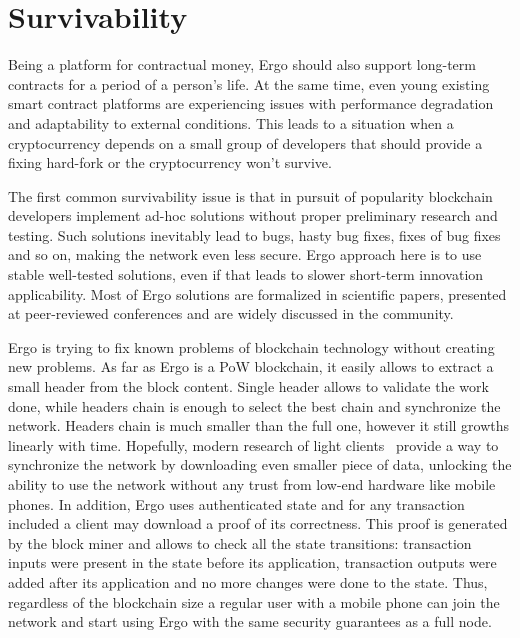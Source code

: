 \section{Survivability}
\label{sec:survivability}


Being a platform for contractual money, Ergo should also support long-term contracts for a
period of a person's life.
At the same time, even young existing smart contract platforms are experiencing issues with performance degradation and
adaptability to external conditions.
This leads to a situation when a cryptocurrency depends on a small group of developers
that should provide a fixing hard-fork or the cryptocurrency won't survive.

The first common survivability issue is that in pursuit of popularity blockchain developers implement ad-hoc
solutions without proper preliminary research and testing.
Such solutions inevitably lead to bugs, hasty bug fixes, fixes of bug fixes and so on, making the network even less secure.
Ergo approach here is to use stable well-tested solutions, even if that leads to slower
short-term innovation applicability.
Most of Ergo solutions are formalized in scientific papers, presented at peer-reviewed conferences
and are widely discussed in the community.

Ergo is trying to fix known problems of blockchain technology without creating new problems.
As far as Ergo is a PoW blockchain, it easily allows to extract a small header from the block content.
Single header allows to validate the work done, while headers chain is enough to select the best chain
and synchronize the network.
Headers chain is much smaller than the full one, however it still growths linearly with time.
Hopefully, modern research of light clients~\cite{kiayias2017non,luuflyclient} provide a way to
synchronize the network by downloading even smaller piece of data, unlocking the ability to
use the network without any trust from low-end hardware like mobile phones.
In addition, Ergo uses authenticated state\cite{reyzin2017improving} and for any transaction included
a client may download a proof of its correctness.
This proof is generated by the block miner and allows to check all the state transitions:
transaction inputs were present in the state before its application,
transaction outputs were added after its application and no more changes were done to the state.
Thus, regardless of the blockchain size a regular user with a
mobile phone can join the network and start using Ergo with the same security
guarantees as a full node.

